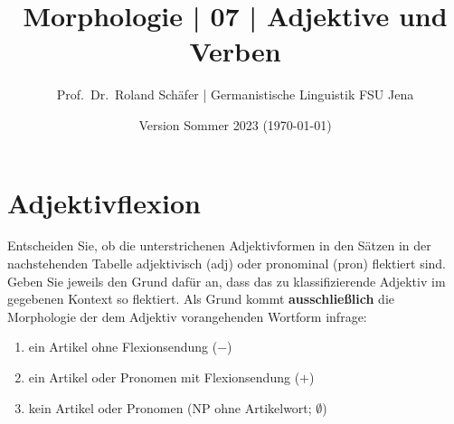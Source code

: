 \documentclass[12pt,a4paper,twoside]{article}
\author{Prof.\ Dr.\ Roland Schäfer | Germanistische Linguistik FSU Jena}
\title{Morphologie | 07 | Adjektive und Verben}
\date{Version Sommer 2023 (\today)}
\newcommand{\Zeile}{\vspace{\baselineskip}}
\newcommand{\Lf}{
  \setlength{\itemsep}{1pt}
  \setlength{\parskip}{0pt}
  \setlength{\parsep}{0pt}
}
\begin{document}
\maketitle

\Zeile

\section{Adjektivflexion}

Entscheiden Sie, ob die unterstrichenen Adjektivformen in den Sätzen in der nachstehenden Tabelle adjektivisch (adj) oder pronominal (pron) flektiert sind.
Geben Sie jeweils den Grund dafür an, dass das zu klassifizierende Adjektiv im gegebenen Kontext so flektiert.
Als Grund kommt \textbf{ausschließlich} die Morphologie der dem Adjektiv vorangehenden Wortform infrage:

\begin{enumerate}\Lf
  \item ein Artikel ohne Flexionsendung ($-$)
  \item ein Artikel oder Pronomen mit Flexionsendung ($+$)
  \item kein Artikel oder Pronomen (NP ohne Artikelwort; $\emptyset$)
\end{enumerate}
\end{document}
